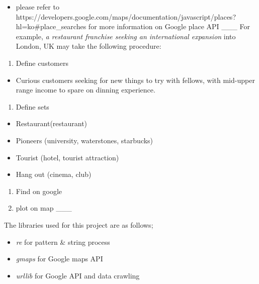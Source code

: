 \documentclass[11pt]{article}
\providecommand{\tightlist}{%
      \setlength{\itemsep}{0pt}\setlength{\parskip}{0pt}}
\begin{document}
\begin{itemize}
\tightlist
\item
  please refer to
  https://developers.google.com/maps/documentation/javascript/places?hl=ko\#place\_searches
  for more information on Google place API \_\_\_ For example, \emph{a
  restaurant franchise seeking an international expansion} into London,
  UK may take the following procedure:
\end{itemize}

\begin{enumerate}
\def\labelenumi{\arabic{enumi}.}
\tightlist
\item
  Define customers
\end{enumerate}

\begin{itemize}
\tightlist
\item
  Curious customers seeking for new things to try with fellows, with
  mid-upper range income to spare on dinning experience.
\end{itemize}

\begin{enumerate}
\def\labelenumi{\arabic{enumi}.}
\setcounter{enumi}{1}
\tightlist
\item
  Define sets
\end{enumerate}

\begin{itemize}
\tightlist
\item
  Restaurant(restaurant)
\item
  Pioneers (university, waterstones, starbucks)
\item
  Tourist (hotel, tourist attraction)
\item
  Hang out (cinema, club)
\end{itemize}

\begin{enumerate}
\def\labelenumi{\arabic{enumi}.}
\setcounter{enumi}{2}
\tightlist
\item
  Find on google
\item
  plot on map \_\_\_
\end{enumerate}

    The libraries used for this project are as follows;

\begin{itemize}
\item
  \emph{re} for pattern \& string process
\item
  \emph{gmaps} for Google maps API
\item
  \emph{urllib} for Google API and data crawling
\end{itemize}
\end{document}
